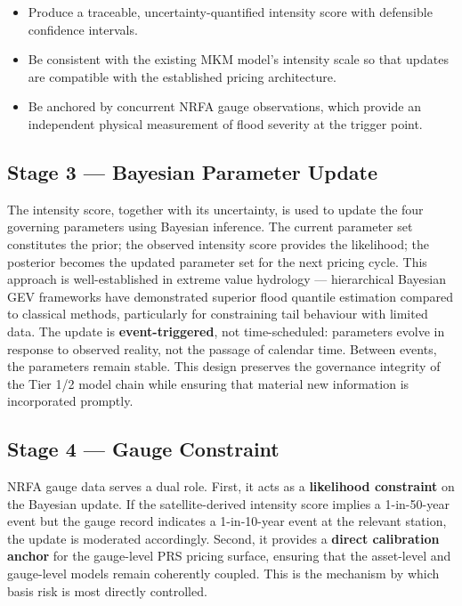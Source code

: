 \documentclass[11pt,a4paper]{article}
\begin{document}
\begin{itemize}
  \item Produce a traceable, uncertainty-quantified intensity score with
  defensible confidence intervals.
  \item Be consistent with the existing MKM model's intensity scale so that
  updates are compatible with the established pricing architecture.
  \item Be anchored by concurrent NRFA gauge observations, which provide an
  independent physical measurement of flood severity at the trigger point.
\end{itemize}

\subsection{Stage 3 --- Bayesian Parameter Update}

The intensity score, together with its uncertainty, is used to update the four
governing parameters using Bayesian inference. The current parameter set
constitutes the prior; the observed intensity score provides the likelihood; the
posterior becomes the updated parameter set for the next pricing cycle. This
approach is well-established in extreme value hydrology --- hierarchical Bayesian
GEV frameworks have demonstrated superior flood quantile estimation compared to
classical methods, particularly for constraining tail behaviour with limited data.
The update is \textbf{event-triggered}, not time-scheduled: parameters evolve in
response to observed reality, not the passage of calendar time. Between events, the
parameters remain stable. This design preserves the governance integrity of the
Tier 1/2 model chain while ensuring that material new information is incorporated
promptly.

\subsection{Stage 4 --- Gauge Constraint}

NRFA gauge data serves a dual role. First, it acts as a \textbf{likelihood
constraint} on the Bayesian update. If the satellite-derived intensity score
implies a 1-in-50-year event but the gauge record indicates a 1-in-10-year event
at the relevant station, the update is moderated accordingly. Second, it provides a
\textbf{direct calibration anchor} for the gauge-level PRS pricing surface,
ensuring that the asset-level and gauge-level models remain coherently coupled.
This is the mechanism by which basis risk is most directly controlled.
\end{document}

